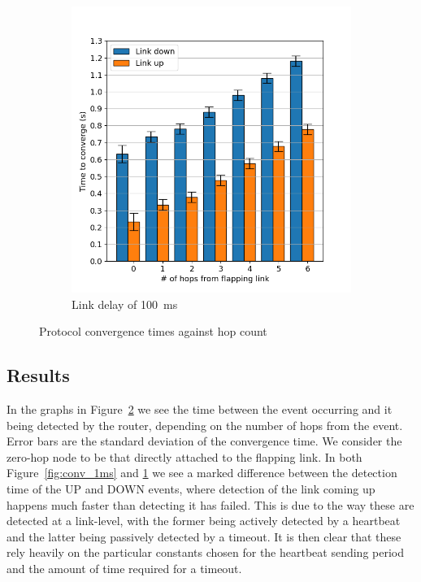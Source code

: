 \documentclass[withindex,glossary,openany]{cam-thesis}
\begin{document}
\begin{figure}
\begin{subfigure}{.5\textwidth}
  \includegraphics[width=1\linewidth]{conv_100ms}
  \caption{Link delay of \SI{100}{\ms}}
  \label{fig:conv_100ms}
\end{subfigure}
\caption{Protocol convergence times against hop count}
\label{fig:conv}
\end{figure}

\subsection{Results}

In the graphs in Figure~\ref{fig:conv} we see the time between the event occurring and it being detected by the router, depending on the number of hops from the event. Error bars are the standard deviation of the convergence time. We consider the zero-hop node to be that directly attached to the flapping link. In both Figure~\ref{fig:conv_1ms} and \ref{fig:conv_100ms} we see a marked difference between the detection time of the UP and DOWN events, where detection of the link coming up happens much faster than detecting it has failed. This is due to the way these are detected at a link-level, with the former being actively detected by a heartbeat and the latter being passively detected by a timeout. It is then clear that these rely heavily on the particular constants chosen for the heartbeat sending period and the amount of time required for a timeout.
\end{document}

